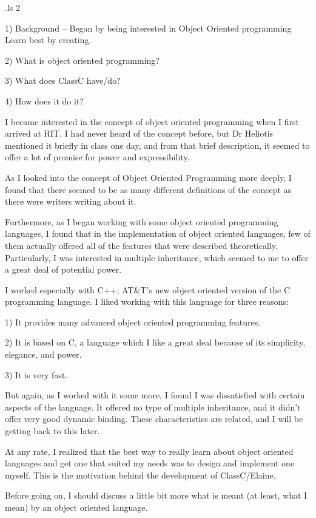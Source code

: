 
.ls 2

1) Background -- Began by being interested in Object Oriented programming
   Learn best by creating.

2)    What is object oriented programming?

3)	What does ClassC have/do?

4)	How does it do it?


I became interested in the concept of object oriented programming when I
first arrived at RIT.  I had never heard of the concept before, but Dr
Heliotis mentioned it briefly in class one day, and from that brief
description, it seemed to offer a lot of promise for power and
expressibility.  

As I looked into the concept of Object Oriented Programming more deeply, I
found that there seemed to be as many different definitions of the concept
as there were writers writing about it.

Furthermore, as I began working with some object oriented programming
languages, I found that in the implementation of object oriented languages,
few of them actually offered all of the features
that were described theoretically.  Particularly, I was interested in 
multiple inheritance, which seemed to me to offer a great deal of
potential power.

I worked especially with C++; AT&T's new object oriented version of the C
programming language.  I liked working with this language for three reasons:

1)	It provides many advanced object oriented programming features.

2)	It is based on C, a language which I like a great deal because
	of its simplicity, elegance, and power.

3)	It is very fast.


But again, as I worked with it some more, I found I was dissatisfied
with certain aspects of the language.  It offered no type of multiple
inheritance, and it didn't offer very good dynamic binding.  
These characteristics are related, and I will be
getting back to this later.

At any rate, I realized that the best way to really learn about object
oriented languages and get one that suited my needs was to design and
implement one myself.  This is the motivation behind the development of
ClassC/Elaine.

Before going on, I should discuss a little bit more what is
meant (at least, what I mean) by an object oriented language.

